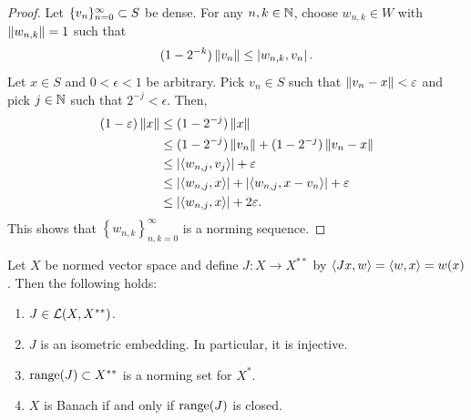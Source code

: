 \documentclass[a4paper]{article}
\begin{document}
\begin{proof}
  
Let $\{ v_n \}_{n=0}^\infty \subset S$ be dense. 
For any $n, k \in \mathbb{N}$, choose $w_{n, k} \in W$ with 
$\left\lVert w_{n, k}\right\rVert = 1$ such that 
\[
(1 - 2^{-k}) \left\lVert v_n\right\rVert \leq \left\lvert w_{n, k}, v_n\right\rvert.
\]
Let $x \in S$ and $0 < \epsilon < 1$ be arbitrary. 
Pick $v_n \in S$ such that $\left\lVert v_n - x\right\rVert < \varepsilon$ and 
pick $j \in \mathbb{N}$ such that $2^{-j} < \epsilon$. Then, 
\[
\begin{aligned}
(1 - \varepsilon) \left\lVert x\right\rVert 
&\leq (1 - 2^{-j}) \left\lVert x\right\rVert  \\
&\leq (1 - 2^{-j}) \left\lVert v_n\right\rVert + (1 - 2^{-j}) \left\lVert v_n - x\right\rVert \\
&\leq \left\lvert \langle w_{n, j}, v_j \rangle\right\rvert + \varepsilon \\
&\leq \left\lvert \langle w_{n, j}, x \rangle\right\rvert + \left\lvert \langle w_{n, j}, 
x - v_n \rangle\right\rvert + \varepsilon \\
&\leq \left\lvert \langle w_{n, j}, x \rangle\right\rvert + 2 \varepsilon.
\end{aligned}
\]
This shows that $\left\{ w_{n, k} \right\}_{n, k = 0}^\infty$
is a norming sequence.

\end{proof}

\begin{thm}
Let $X$ be normed vector space and define $J: X \to X^{**}$ 
by $\left\langle Jx, w \right\rangle = \left\langle w, x \right\rangle = w(x)$. Then the following
holds:
\begin{enumerate}
\item $J \in \mathcal{L}(X, X^{**})$. 
\item $J$ is an isometric embedding. In particular, it is 
injective.
\item $\operatorname{range}(J) \subset X^{**}$ is a norming set for $X^*$.
\item $X$ is Banach if and only if $\operatorname{range}(J)$ is closed.
\end{enumerate}
\end{thm}
\end{document}
